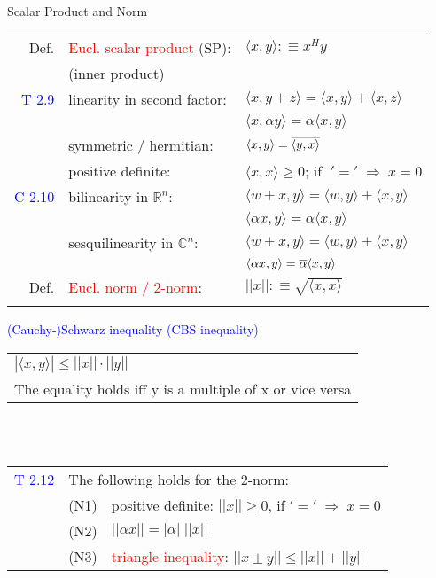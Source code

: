 \begin{mainbox}{Scalar Product and Norm}
\setlength{\tabcolsep}{2pt}
\begin{tabular}{rll}
	Def. & \textcolor{red}{Eucl. scalar product} (SP):& $\langle x,y\rangle :\equiv x^Hy$\\
	& (inner product) & \\
	\rule{0pt}{3ex}
	\textcolor{blue}{T 2.9} & linearity in second factor: & $\langle x,y+z\rangle = \langle x,y\rangle + \langle x,z\rangle$\\
	& & $\langle x,\alpha y\rangle = \alpha \langle x,y\rangle$\\
	& symmetric / hermitian: & $\langle x,y\rangle = \overline{\langle y,x \rangle}$\\
	& positive definite: & $\langle x,x\rangle \geq 0$; if $\;'='\;\Rightarrow\;x = 0$\\ 
	\rule{0pt}{3ex}
	\textcolor{blue}{C 2.10} & bilinearity in $\mathbb{R}^n$: & $\langle w+x,y\rangle = \langle w,y\rangle + \langle x,y\rangle$\\
	& & $\langle \alpha x,y\rangle = \alpha \langle x,y\rangle$\\
	& sesquilinearity in $\mathbb{C}^n$: & $\langle w+x,y\rangle = \langle w,y\rangle + \langle x,y\rangle$\\
	& & $\langle \alpha x,y\rangle = \overline{\alpha} \langle x,y\rangle$\\ 
	\rule{0pt}{3ex}
	Def. & \textcolor{red}{Eucl. norm / 2-norm}: & $||x|| :\equiv \sqrt{\langle x,x \rangle}$\\
	\rule{0pt}{3ex}
\end{tabular}
\textcolor{blue}{(Cauchy-)Schwarz inequality (CBS inequality)} \\
\begin{tabular}{l}
	$|\langle x,y\rangle| \leq ||x|| \cdot ||y||$\\
	The equality holds iff y is a multiple of x or vice versa\\
\end{tabular}\\
\smallskip\\
\setlength{\tabcolsep}{2pt}
\begin{tabular}{rrl}
	\textcolor{blue}{T 2.12} & \multicolumn{2}{l}{The following holds for the 2-norm:} \\
	& (N1) & positive definite: $||x|| \geq 0$, if$\;'='\;\Rightarrow\; x = 0$\\
	& (N2) & $||\alpha x|| = |\alpha |\;||x||$\\
	& (N3) & \textcolor{red}{triangle inequality}: $||x\pm y|| \leq ||x|| + ||y||$\\

\end{tabular}
\end{mainbox}

